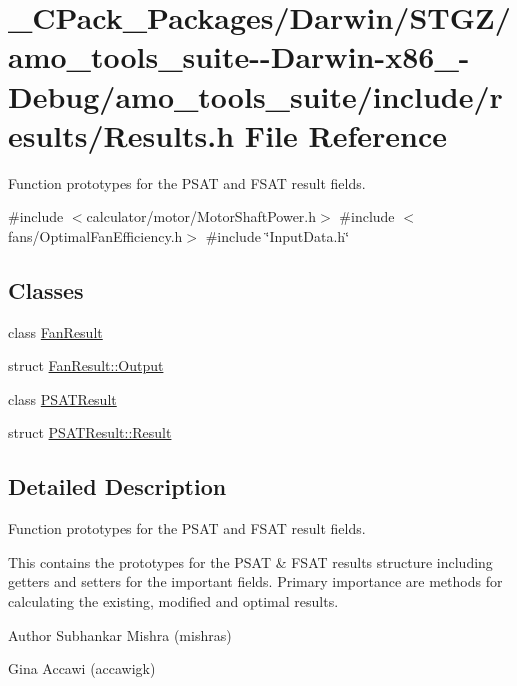 \hypertarget{___c_pack___packages_2_darwin_2_s_t_g_z_2amo__tools__suite--_darwin-x86__64-_debug_2amo__tools__c61f89930adec91d85dee64787ce69a0}{}\section{\+\_\+\+C\+Pack\+\_\+\+Packages/\+Darwin/\+S\+T\+G\+Z/amo\+\_\+tools\+\_\+suite-\/-\/\+Darwin-\/x86\+\_-\/\+Debug/amo\+\_\+tools\+\_\+suite/include/results/\+Results.h File Reference}
\label{___c_pack___packages_2_darwin_2_s_t_g_z_2amo__tools__suite--_darwin-x86__64-_debug_2amo__tools__c61f89930adec91d85dee64787ce69a0}


Function prototypes for the P\+S\+AT and F\+S\+AT result fields.  


{\ttfamily \#include $<$calculator/motor/\+Motor\+Shaft\+Power.\+h$>$}\newline
{\ttfamily \#include $<$fans/\+Optimal\+Fan\+Efficiency.\+h$>$}\newline
{\ttfamily \#include \char`\"{}Input\+Data.\+h\char`\"{}}\newline
\subsection*{Classes}
\begin{DoxyCompactItemize}
\item 
class \hyperlink{class_fan_result}{Fan\+Result}
\item 
struct \hyperlink{struct_fan_result_1_1_output}{Fan\+Result\+::\+Output}
\item 
class \hyperlink{class_p_s_a_t_result}{P\+S\+A\+T\+Result}
\item 
struct \hyperlink{struct_p_s_a_t_result_1_1_result}{P\+S\+A\+T\+Result\+::\+Result}
\end{DoxyCompactItemize}


\subsection{Detailed Description}
Function prototypes for the P\+S\+AT and F\+S\+AT result fields. 

This contains the prototypes for the P\+S\+AT \& F\+S\+AT results structure including getters and setters for the important fields. Primary importance are methods for calculating the existing, modified and optimal results.

\begin{DoxyAuthor}{Author}
Subhankar Mishra (mishras) 

Gina Accawi (accawigk) 
\end{DoxyAuthor}
